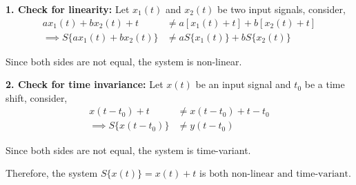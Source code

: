 \documentclass[a4paper, 10pt]{article}
\begin{document}
\begin{solution}
\vspace{2mm}

\par\noindent\textbf{1. Check for linearity:}
Let \( x_1(t) \) and \( x_2(t) \) be two input signals, consider,
\begin{align*}
a x_1(t) + b x_2(t) + t &\neq a [ x_1(t) + t ] + b [ x_2(t) + t ] \\
\implies S\{ a x_1(t) + b x_2(t) \} &\neq a S\{ x_1(t) \} + b S\{ x_2(t) \}
\end{align*}

Since both sides are not equal, the system is non-linear.

\vspace{2mm}

\par\noindent\textbf{2. Check for time invariance:}
Let \( x(t) \) be an input signal and \( t_0 \) be a time shift, consider,
\begin{align*}
x(t - t_0) + t &\neq x(t - t_0) + t - t_0 \\
\implies S\{ x(t - t_0) \} &\neq y(t - t_0)
\end{align*}

Since both sides are not equal, the system is time-variant.

Therefore, the system \( S\{ x(t) \} = x(t) + t \) is \( \boxed{\text{both non-linear and time-variant}} \).
\end{solution}
\end{document}
